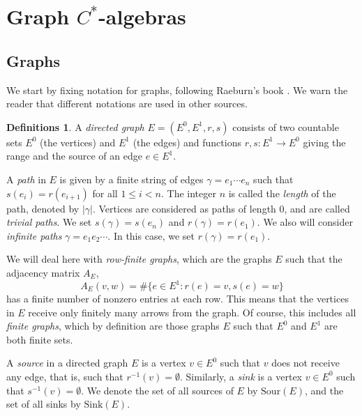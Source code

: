 \documentclass[11pt]{amsart}
\theoremstyle{plain}            %
\theoremstyle{definition}       %
\theoremstyle{definition}       %
\newtheorem{definitions}[theorem]{Definitions}
\theoremstyle{remark}
\newcommand{\Sour}{\mathrm{Sour}}
\newcommand{\Sink}{\mathrm{Sink}}
\begin{document}
\vskip2cm



\section{Graph $C^*$-algebras}
\label{sect:graphs}


\vskip1cm






\subsection{Graphs}

We start by fixing notation for graphs, following Raeburn's book \cite{rae}. We warn the reader that different notations are used in other sources. 


\begin{definitions}
	\label{defs:graphs} A {\it directed graph} $E=(E^0,E^1,r,s)$ consists of two countable sets $E^0$ (the vertices) and $E^1$ (the edges) and functions $r,s\colon E^1\to E^0$ giving the range and the source of an edge $e\in E^1$.   

A {\it path} in $E$ is given by a finite string of edges $\gamma = e_1\cdots e_n $ such that $s(e_i)= r(e_{i+1})$ for all $1\le i <n$. The integer $n$ is called the {\it length} of the path, denoted by
$|\gamma |$. Vertices are considered as paths of length $0$, and are called {\it trivial paths}.  
We set $s(\gamma) = s(e_n)$ and $r(\gamma ) = r(e_1)$. We also will consider {\it infinite paths} $\gamma = e_1 e_2\cdots $. In this case, we set $r(\gamma) = r(e_1)$.
\end{definitions}

We will deal here with {\it row-finite graphs}, which are the graphs $E$ such that the adjacency matrix $A_E$,
$$A_E(v,w) = \# \{ e\in E^1 : r(e) = v, s(e) = w \}$$ 
has a finite number of nonzero entries at each row. This means that the vertices in $E$ receive only finitely many arrows from the graph.
Of course, this includes all {\it finite graphs}, which by definition are those graphs $E$ such that $E^0$ and $E^1$ are both finite sets. 

A {\it source} in a directed graph $E$ is a vertex $v\in E^0$ such that $v$ does not receive any edge, that is, such that $r^{-1}(v) = \emptyset$. Similarly, a {\it sink} is a vertex $v\in E^0$ such that $s^{-1}(v)= \emptyset$. We denote the set of all sources of $E$ by $\Sour (E)$, and the set of all sinks by $\Sink (E)$. 
\end{document}
